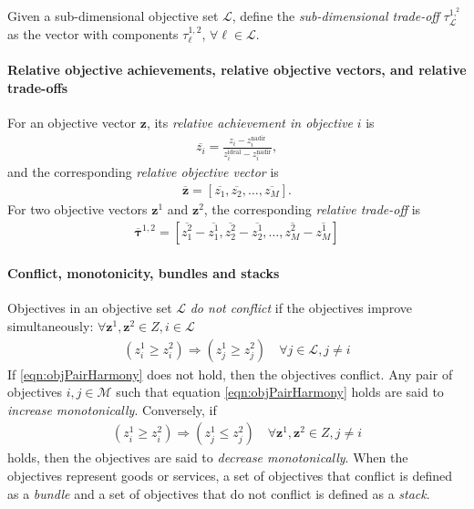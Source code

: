 Given a sub-dimensional objective set $\mathcal{L}$, define the \textit{sub-dimensional trade-off} $\tau^{1,^2}_\mathcal{L}$ as the vector with components $\tau^{1,2}_\ell$, $\forall \ell \in \mathcal{L}$.

\paragraph{Relative objective achievements, relative objective vectors, and relative trade-offs}
For an objective vector $\mathbf{z}$, its \textit{relative achievement in objective }$i$ is
\begin{align}
\overbar{z_i} = \frac{z_i - z^\text{nadir}_i}{z^\text{ideal}_i - z^\text{nadir}_i},
\end{align}
and the corresponding \textit{relative objective vector} is
\begin{align}
\overbar{\mathbf{z}} = [\overbar{z_1},\overbar{z_2},\ldots,\overbar{z_M}].
\end{align}
For two objective vectors $\mathbf{z}^1$ and $\mathbf{z}^2$, the corresponding \textit{relative trade-off} is
\begin{align}
\overbar{\mathbf{\tau}}^{1,2} = \left[\overbar{z^2_1} - \overbar{z^1_1}, \overbar{z^2_2} - \overbar{z^1_2}, \ldots, \overbar{z^2_M} - \overbar{z^1_M}\right]
\end{align}

\paragraph{Conflict, monotonicity, bundles and stacks}
Objectives in an objective set $\mathcal{L}$ \textit{do not conflict} if the objectives improve simultaneously:
$\forall \mathbf{z}^1, \mathbf{z}^2 \in Z, i \in \mathcal{L}$
\begin{align}
(z^1_i \ge z^2_i) \Rightarrow (z^1_j \ge z^2_j) \quad \forall j \in \mathcal{L}, j \neq i \label{eqn:objPairHarmony}
\end{align}
If \eqref{eqn:objPairHarmony} does not hold, then the objectives conflict. Any pair of objectives $i,j \in \mathcal{M}$ such that equation \eqref{eqn:objPairHarmony} holds are said to \textit{increase monotonically}. Conversely, if 
\begin{align}
(z^1_i \ge z^2_i) \Rightarrow (z^1_j \le z^2_j) \quad \forall \mathbf{z}^1, \mathbf{z}^2 \in Z, j \neq i \label{eqn:objPairMonoDec}
\end{align}
holds, then the objectives are said to \textit{decrease monotonically}. When the objectives represent goods or services, a set of objectives that conflict is defined as a \textit{bundle} and a set of objectives that do not conflict is defined as a \textit{stack}.

